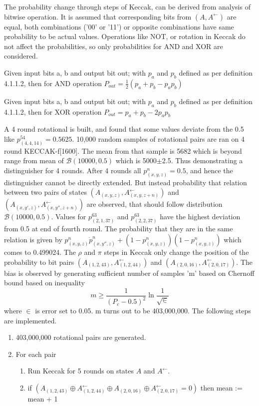 The probability change through steps of Keccak, can be derived from analysis of bitwise operation. It is assumed
that corresponding bits from $(A, A^{\leftarrow})$ are equal, both combinations ('00' or '11') or opposite combinations
have same probability to be actual values. Operations like NOT, or rotation in Keccak do not affect the probabilities,
so only probabilities for AND and XOR are considered.

\begin{lem}
Given input bits a, b and output bit out; with $p_a$ and $p_b$ defined as per definition 4.1.1.2, then for AND operation
$P_{out} = \frac{1}{2}(p_{a} + p_{b} - p_{a} p_{b})$ \cite{00022}
\end{lem}

\begin{lem}
Given input bits a, b and output bit out; with $p_a$ and $p_b$ defined as per definition 4.1.1.2, then for XOR operation
$P_{out} = p_{a} + p_{b} - 2 p_{a} p_{b}$ \cite{00022}
\end{lem}

A 4 round rotational is built, and found that some values deviate from the 0.5 like $p^{54}_{(4, 4, 14)} = 0.5625$. 10,000
random samples of rotational pairs are ran on 4 round KECCAK-f[1600]. The mean from that sample is 5682 which is beyond
range from mean of $\mathcal{B}(10000, 0.5)$ which is 5000$\pm$2.5. Thus demonstrating a distinguisher for 4 rounds.
After 4 rounds all $p^n_{(x, y, z)} = 0.5$, and hence the distinguisher cannot be directly extended. But instead probability
that relation between two pairs of states $(A_{(x, y, z)}, A^{\leftarrow}_{(x, y, z+n)})$ and 
$(A_{(x, y', z)}, A^{\leftarrow}_{(x, y'', z+n)})$ are observed, that should follow distribution $\mathcal{B}(10000, 0.5)$.
Values for $p^63_{(2, 1, 37)}$ and $p^63_{(2, 2, 37)}$ have the highest deviation from 0.5 at end of fourth round. The
probability that they are in the same relation is given by $p^n_{(x, y, z)} \dot p^n_{(x, y'', z)} + (1 - p^n_{(x, y, z)})
(1 - p^n_{(x, y, z)})$ which comes to 0.499024. The $\rho$ and $\pi$ steps in Keccak only change the position of the
probability to bit pairs $(A_{(1, 2, 43)}, A^{\leftarrow}_{(1, 2, 44)})$ and $(A_{(2, 0, 16)}, A^{\leftarrow}_{(2, 0, 17)})$.
The bias is observed by generating sufficient number of samples 'm' based on Chernoff bound based on inequality 
\[ m \geq \frac{1}{(P_c - 0.5)^2} \ln \frac{1}{\sqrt \in}\]
where $\in$ is error set to 0.05. m turns out to be 403,000,000. The following steps are implemented.\cite{00022}
\begin{enumerate}
\item 403,000,000 rotational pairs are generated.
\item For each pair
  \begin{enumerate}
  \item Run Keccak for 5 rounds on states $A$ and $A^{\leftarrow}$.
  \item if $(A_{(1, 2, 43)} \oplus A^{\leftarrow}_{(1, 2, 44)} \oplus A_{(2, 0, 16)} \oplus A^{\leftarrow}_{(2, 0, 17)} = 0)$
  then \newline mean := mean + 1
  \end{enumerate}
\end{enumerate}

